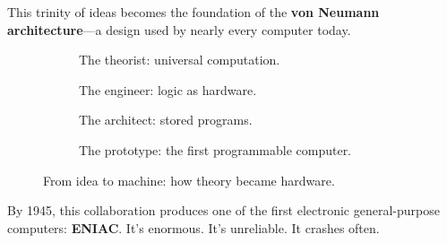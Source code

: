 This trinity of ideas becomes the foundation of the \textbf{von Neumann architecture}—a design used by nearly every computer today.

\begin{figure}[H]
\centering
\begin{subfigure}[t]{0.45\textwidth}
\centering
{}
\caption*{The theorist: universal computation.}
\end{subfigure}
\hfill
\begin{subfigure}[t]{0.45\textwidth}
\centering
{}
\caption*{The engineer: logic as hardware.}
\end{subfigure}

\vspace{1em}

\begin{subfigure}[t]{0.45\textwidth}
\centering
{}
\caption*{The architect: stored programs.}
\end{subfigure}
\hfill
\begin{subfigure}[t]{0.45\textwidth}
\centering
{}
\caption*{The prototype: the first programmable computer.}
\end{subfigure}

\caption{From idea to machine: how theory became hardware.}
\end{figure}

\medskip

By 1945, this collaboration produces one of the first electronic general-purpose computers: \textbf{ENIAC}. It’s enormous. It’s unreliable. It crashes often.

